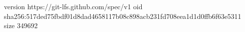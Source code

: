 version https://git-lfs.github.com/spec/v1
oid sha256:517ded75fbdf01d8dad4658117b08c898acb231fd708eea1d1d0ffb6f63e5311
size 349692
